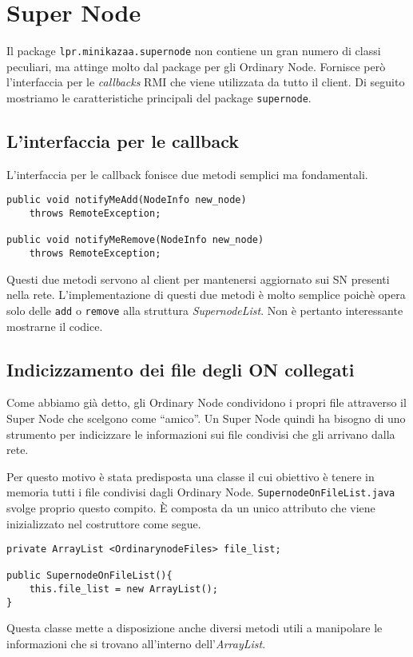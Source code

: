 \chapter{Super Node}
Il package \verb|lpr.minikazaa.supernode| non contiene un gran numero di classi peculiari, ma attinge molto dal package per gli Ordinary Node.
Fornisce però l'interfaccia per le \emph{callbacks} RMI che viene utilizzata da tutto il client.
Di seguito mostriamo le caratteristiche principali del package \verb|supernode|.
\section{L'interfaccia per le callback}
L'interfaccia per le callback fonisce due metodi semplici ma fondamentali.
\begin{lstlisting}
public void notifyMeAdd(NodeInfo new_node)
	throws RemoteException;

public void notifyMeRemove(NodeInfo new_node)
	throws RemoteException;
\end{lstlisting}
Questi due metodi servono al client per mantenersi aggiornato sui SN presenti nella rete.
L'implementazione di questi due metodi è molto semplice poichè opera solo delle \verb|add| o \verb|remove| alla struttura \emph{SupernodeList}.
Non è pertanto interessante mostrarne il codice.

\section{Indicizzamento dei file degli ON collegati}
Come abbiamo già detto, gli Ordinary Node condividono i propri file attraverso il Super Node che scelgono come ``amico''. Un Super Node quindi ha bisogno di uno strumento per indicizzare le informazioni sui file condivisi che gli arrivano dalla rete.

Per questo motivo è stata predisposta una classe il cui obiettivo è tenere in memoria tutti i file condivisi dagli Ordinary Node.
\verb|SupernodeOnFileList.java| svolge proprio questo compito.
\`{E} composta da un unico attributo che viene inizializzato nel costruttore come segue.
\begin{lstlisting}
private ArrayList <OrdinarynodeFiles> file_list;

public SupernodeOnFileList(){
	this.file_list = new ArrayList();
}
\end{lstlisting}
Questa classe mette a disposizione anche diversi metodi utili a manipolare le informazioni che si trovano all'interno dell'\emph{ArrayList}.
